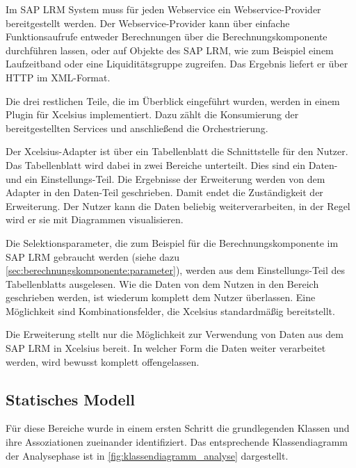 \begin{onehalfspacing}
Im SAP LRM System muss für jeden Webservice ein Webservice-Provider bereitgestellt werden. Der Webservice-Provider kann über einfache Funktionsaufrufe entweder Berechnungen über die Berechnungskomponente durchführen lassen, oder auf Objekte des SAP LRM, wie zum Beispiel einem Laufzeitband oder eine Liquiditätsgruppe zugreifen. Das Ergebnis liefert er über \gls{HTTP} im \gls{XML}-Format.

Die drei restlichen Teile, die im Überblick eingeführt wurden, werden in einem Plugin für \gls{Xcelsius} implementiert. Dazu zählt die Konsumierung der bereitgestellten Services und anschließend die Orchestrierung.

Der \gls{Xcelsius}-Adapter ist über ein Tabellenblatt die Schnittstelle für den Nutzer. Das Tabellenblatt wird dabei in zwei Bereiche unterteilt. Dies sind ein Daten- und ein Einstellungs-Teil. Die Ergebnisse der Erweiterung werden von dem Adapter in den Daten-Teil geschrieben. Damit endet die Zuständigkeit der Erweiterung. Der Nutzer kann die Daten beliebig weiterverarbeiten, in der Regel wird er sie mit Diagrammen visualisieren.

Die Selektionsparameter, die zum Beispiel für die Berechnungskomponente im SAP LRM gebraucht werden (siehe dazu \vref{sec:berechnungskomponente:parameter}), werden aus dem Einstellungs-Teil des Tabellenblatts ausgelesen. Wie die Daten von dem Nutzen in den Bereich geschrieben werden, ist wiederum komplett dem Nutzer überlassen. Eine Möglichkeit sind Kombinationsfelder, die \gls{Xcelsius} standardmäßig bereitstellt.

Die Erweiterung stellt nur die Möglichkeit zur Verwendung von Daten aus dem SAP LRM in \gls{Xcelsius} bereit. In welcher Form die Daten weiter verarbeitet werden, wird bewusst komplett offengelassen.

\subsection{Statisches Modell}
Für diese Bereiche wurde in einem ersten Schritt die grundlegenden Klassen und ihre Assoziationen zueinander identifiziert. Das entsprechende Klassendiagramm der Analysephase ist in \vref{fig:klassendiagramm_analyse} dargestellt.


\end{onehalfspacing}
